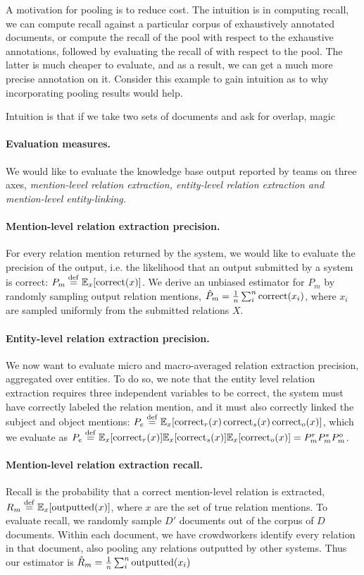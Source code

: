 A motivation for pooling is to reduce cost.
The intuition is in computing recall, we can compute recall against a particular corpus of exhaustively annotated documents,
or compute the recall of the pool with respect to the exhaustive annotations, followed by evaluating the recall of with respect to the pool. 
The latter is much cheaper to evaluate, and as a result, we can get a much more precise annotation on it.
Consider this example to gain intuition as to why incorporating pooling results would help.

Intuition is that if we take two sets of documents and ask for overlap, magic 

\paragraph{Evaluation measures.} 
We would like to evaluate the knowledge base output reported by teams on three axes, \it{mention-level relation extraction}, \it{entity-level relation extraction} and \it{mention-level entity-linking}.

\paragraph{Mention-level relation extraction precision.}
For every relation mention returned by the system, we would like to evaluate the precision of the output, i.e. the likelihood that an output submitted by a system is correct: $P_m \stackrel{\rm def}{=} \mathbb{E}_{x}[\operatorname{correct}(x)]$.
We derive an unbiased estimator for $P_m$ by randomly sampling output relation mentions, $\hat{P}_m = \frac{1}{n} \sum_{i}^n \operatorname{correct}(x_i)$, where $x_i$ are sampled uniformly from the submitted relations $X$.

\paragraph{Entity-level relation extraction precision.}
We now want to evaluate micro and macro-averaged relation extraction precision, aggregated over entities. 
To do so, we note that the entity level relation extraction requires three independent variables to be correct, the system must have correctly labeled the relation mention, and it must also correctly linked the subject and object mentions: $P_e \stackrel{\rm def}{=} \mathbb{E}_{x}[ \operatorname{correct}_r(x) \operatorname{correct}_s(x) \operatorname{correct}_o(x)]$, which we evaluate as $P_e \stackrel{\rm def}{=} \mathbb{E}_{x}[\operatorname{correct}_r(x)] \mathbb{E}_{x}[\operatorname{correct}_s(x)]\mathbb{E}_{x}[ \operatorname{correct}_o(x)] = P^r_m P^s_m P^o_m$.

\paragraph{Mention-level relation extraction recall.}
Recall is the probability that a correct mention-level relation is extracted,
  $R_m \stackrel{\rm def}{=} \mathbb{E}_{x}[\operatorname{outputted}(x)]$, where $x$ are the set of true relation mentions.
To evaluate recall, we randomly sample $D'$ documents out of the corpus of $D$ documents.
Within each document, we have crowdworkers identify every relation in that document, also pooling any relations outputted by other systems. 
Thus our estimator is $\hat{R}_m = \frac{1}{n} \sum_{i}^n \operatorname{outputted}(x_i)$ 

